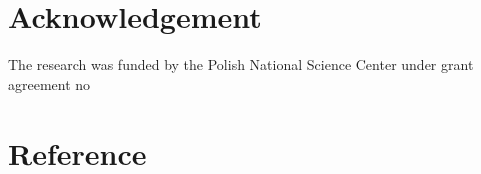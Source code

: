 \documentclass[preprint,12pt]{elsarticle}
\begin{document}
\section*{Acknowledgement}
The research was funded by the Polish National Science Center under grant agreement no 




\section*{Reference}
{}

\end{document}
